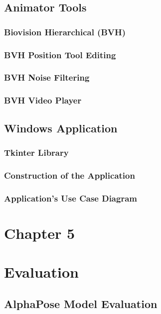 \documentclass[12pt,oneside,a4paper,english]{article}
\begin{document}
\subsection{Animator Tools}

\subsubsection{Biovision Hierarchical (BVH)}

\subsubsection{BVH Position Tool Editing}

\subsubsection{BVH Noise Filtering}

\subsubsection{BVH Video Player}

\subsection{Windows Application}

\subsubsection{Tkinter Library}

\subsubsection{Construction of the Application }

\subsubsection{Application's Use Case Diagram}


\newpage
\section*{Chapter 5 \\}
\section{Evaluation}

\subsection{AlphaPose Model Evaluation}

\end{document}
